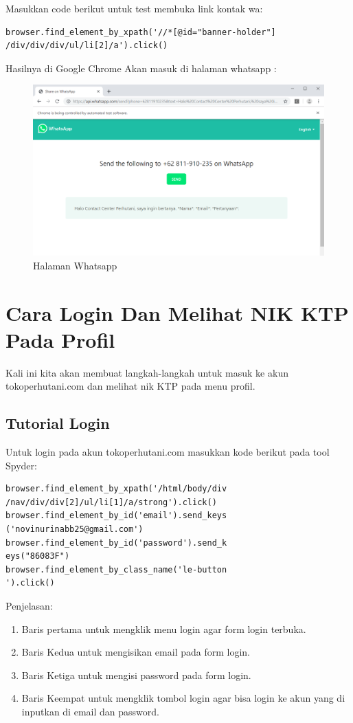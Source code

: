 Masukkan code berikut untuk test membuka link kontak wa:

\begin{verbatim}
browser.find_element_by_xpath('//*[@id="banner-holder"]
/div/div/div/ul/li[2]/a').click()
\end{verbatim}

Hasilnya  di Google Chrome Akan masuk di halaman whatsapp : 

\begin{figure}[h]
	\centering
	\includegraphics[scale=0.25]{figures/5linkwa}
	\caption{Halaman Whatsapp}
\end{figure}

\newpage
\section{Cara Login Dan Melihat NIK KTP Pada Profil}
Kali ini kita akan membuat langkah-langkah untuk masuk ke akun tokoperhutani.com dan melihat nik KTP pada menu profil.  
\subsection{Tutorial Login}
Untuk login pada akun tokoperhutani.com masukkan kode berikut pada tool Spyder:
\begin{verbatim}
browser.find_element_by_xpath('/html/body/div
/nav/div/div[2]/ul/li[1]/a/strong').click()
browser.find_element_by_id('email').send_keys
('novinurinabb25@gmail.com')
browser.find_element_by_id('password').send_k
eys("86083F")
browser.find_element_by_class_name('le-button
').click()
\end{verbatim}

Penjelasan:
\begin{enumerate}
	\item Baris pertama untuk mengklik menu login agar form login terbuka.
	\item Baris Kedua untuk mengisikan email pada form login. 
	\item Baris Ketiga untuk mengisi password pada form login.
	\item Baris Keempat untuk mengklik tombol login agar bisa login ke akun yang di inputkan di email dan password.
\end{enumerate}

